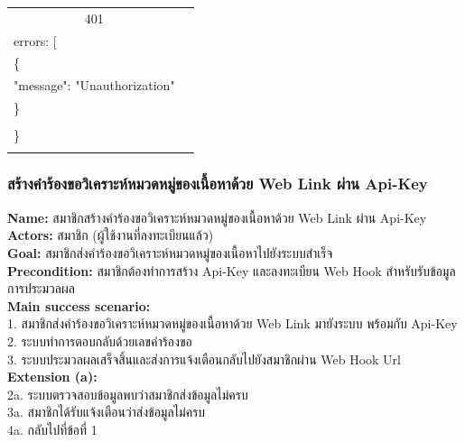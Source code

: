 \documentclass[12pt,oneside,openright,a4paper]{cpe-thai-project}
\begin{document}
\begin{longtable}[!ht]{p{3cm}|p{8cm}}
    \multicolumn{1}{c|}{401}  &
    \begin{tabular}[c]{@{}l@{}}\{\\ \quad errors: {[}\\ \quad\quad\{\\ \quad\quad\quad"message": "Unauthorization"\\ \quad\quad\}\\\quad {]}\\ \}\end{tabular}                                                                         \\ \hline
    \hhline{==}
\end{longtable}

\subsubsection{สร้างคำร้องขอวิเคราะห์หมวดหมู่ของเนื้อหาด้วย Web Link ผ่าน Api-Key}
\textbf{Name: }สมาชิกสร้างคำร้องขอวิเคราะห์หมวดหมู่ของเนื้อหาด้วย Web Link ผ่าน Api-Key \\
\textbf{Actors: }สมาชิก (ผู้ใช้งานที่ลงทะเบียนแล้ว) \\
\textbf{Goal: }สมาชิกส่งคำร้องขอวิเคราะห์หมวดหมู่ของเนื้อหาไปยังระบบสำเร็จ \\
\textbf{Precondition: }สมาชิกต้องทำการสร้าง Api-Key และลงทะเบียน Web Hook สำหรับรับข้อมูลการประมวลผล \\
\textbf{Main success scenario: } \\
  \hspace*{0.5cm}1. สมาชิกส่งคำร้องขอวิเคราะห์หมวดหมู่ของเนื้อหาด้วย Web Link มายังระบบ พร้อมกับ Api-Key \\
  \hspace*{0.5cm}2. ระบบทำการตอบกลับด้วยเลขคำร้องขอ \\
  \hspace*{0.5cm}3. ระบบประมวลผลเสร็จสิ้นและส่งการแจ้งเตือนกลับไปยังสมาชิกผ่าน Web Hook Url  \\
\textbf{Extension (a): } \\
  \hspace*{0.5cm}2a. ระบบตรวจสอบข้อมูลพบว่าสมาชิกส่งข้อมูลไม่ครบ \\
  \hspace*{0.5cm}3a. สมาชิกได้รับแจ้งเตือนว่าส่งข้อมูลไม่ครบ \\
  \hspace*{0.5cm}4a. กลับไปที่ข้อที่ 1 \newpage
\end{document}
